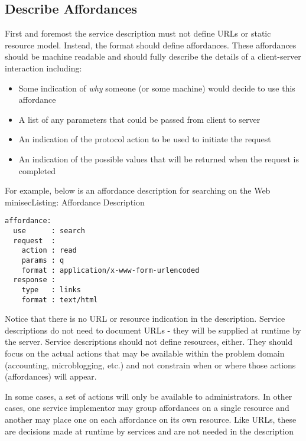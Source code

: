 \documentclass{wsrest2014}
\begin{document}
\subsection{Describe Affordances}
\label{_describe_affordances}
 \par{}First and foremost the service description must not define URLs or static resource model. Instead, the format should define affordances. These affordances should be machine readable and should fully describe the details of a client-server interaction including:
  \begin{itemize}
\item%
Some indication of \emph{why} someone (or some machine) would decide to use this affordance

\item%
A list of any parameters that could be passed from client to server

\item%
An indication of the protocol action to be used to initiate the request

\item%
An indication of the possible values that will be returned when the request is completed

\end{itemize}
 \par{}For example, below is an affordance description for searching on the Web
\\minisec{Listing: Affordance Description}
\begin{verbatim}affordance:
  use      : search
  request  :
    action : read
    params : q
    format : application/x-www-form-urlencoded
  response :
    type   : links
    format : text/html\end{verbatim}

 \par{}Notice that there is no URL or resource indication in the description. Service descriptions do not need to document URLs - they will be supplied at runtime by the server. Service descriptions should not define resources, either. They should focus on the actual actions that may be available within the problem domain (accounting, microblogging, etc.) and not constrain when or where those actions (affordances) will appear.
 \par{}In some cases, a set of actions will only be available to administrators. In other cases, one service implementor may group affordances on a single resource and another may place one on each affordance on its own resource. Like URLs, these are decisions made at runtime by services and are not needed in the description
\hypertarget{_focus_on_vocabulary}{}
\end{document}
